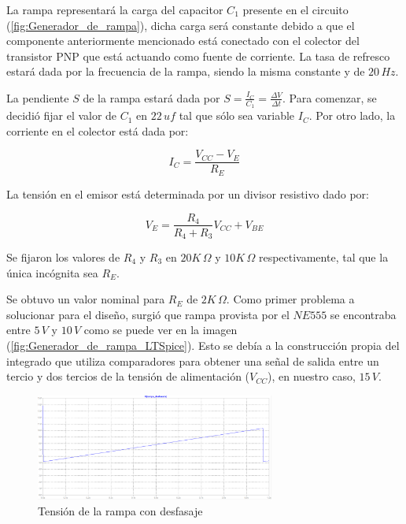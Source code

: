 La rampa representará la carga del capacitor $C_1$ presente en el circuito (\ref{fig:Generador_de_rampa}), dicha carga será constante debido a que el componente anteriormente mencionado está conectado con el colector del transistor PNP que está actuando como fuente de corriente. La tasa de refresco estará dada por la frecuencia de la rampa, siendo la misma constante y de $20\, Hz$. \par
La pendiente $S$ de la rampa estará dada por $S=\frac{I_C}{C_1}=\frac{\Delta V}{\Delta t}$.
Para comenzar, se decidió fijar el valor de $C_1$ en $22\,uf$ tal que sólo sea variable $I_C$. Por otro lado, la corriente en el colector está dada por:

\begin{equation}
I_C=\frac{V_{CC}-V_E}{R_E}
\end{equation}

La tensión en el emisor está determinada por un divisor resistivo dado por:

\begin{equation}
V_E=\frac{R_4}{R_4+R_3} V_{CC} + V_{BE}
\end{equation}

Se fijaron los valores de $R_4$ y $R_3$ en $20K\,\Omega$ y $10K\,\Omega$ respectivamente, tal que la única incógnita sea $R_E$. \par
Se obtuvo un valor nominal para $R_E$ de $2K\,\Omega$. 
Como primer problema a solucionar para el diseño, surgió que rampa provista por el $NE555$ se encontraba entre $5\,V$ y $10\,V$ como se puede ver en la imagen (\ref{fig:Generador_de_rampa_LTSpice}). Esto se debía a la construcción propia del integrado que utiliza comparadores para obtener una señal de salida entre un tercio y dos tercios de la tensión de alimentación ($V_{CC}$), en nuestro caso, $15\,V$.


\begin{figure}[H]
\centering
\includegraphics[width=0.7\textwidth]{Ejercicio8/Imagenes/Rampa_desfasada}
\caption{Tensión de la rampa con desfasaje}
\label{fig:Generador_de_rampa_desfasada_LTSpice}
\end{figure}

